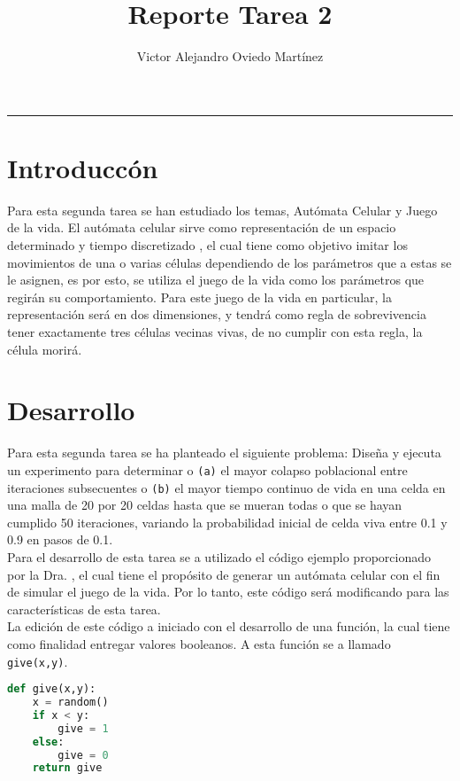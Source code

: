 \documentclass{article}
\title{Reporte Tarea 2}
\author{Victor Alejandro Oviedo Martínez}
\begin{document}
\maketitle
\hrule

\section{Introduccón}\label{intro}
Para esta segunda tarea\citep{DRA.P2} se han estudiado los temas, Autómata Celular\citep{AutoCelular} y Juego de la vida\citep{JVida}. El autómata celular sirve como representación de un espacio determinado y tiempo discretizado , el cual tiene como objetivo imitar los movimientos de una o varias células dependiendo de los parámetros que a estas se le asignen, es por esto, se utiliza el juego de la vida como los parámetros que regirán su comportamiento. Para este juego de la vida en particular, la representación será en dos dimensiones, y tendrá como regla de sobrevivencia  tener exactamente tres células vecinas vivas, de no cumplir con esta regla, la célula morirá. 

\section{Desarrollo}


Para esta segunda tarea se ha planteado el siguiente problema: Diseña y ejecuta un experimento para determinar o \texttt{(a)} el mayor colapso poblacional entre iteraciones subsecuentes o \texttt{(b)} el mayor tiempo continuo de vida en una celda en una malla de 20 por 20 celdas hasta que se mueran todas o que se hayan cumplido 50 iteraciones, variando la probabilidad inicial de celda viva entre 0.1 y 0.9 en pasos de 0.1.\\

Para el desarrollo de esta tarea se a utilizado el código ejemplo proporcionado por la Dra. \citet{Ejem}, el cual tiene el propósito de generar un autómata celular con el fin de simular el juego de la vida. Por lo tanto, este código será modificando para las características de esta tarea.\\

La edición de este código a iniciado con el desarrollo de una función, la cual tiene como finalidad entregar valores booleanos. A esta función se a llamado \texttt{give(x,y)}.\\

\begin{lstlisting}[language=Python]
def give(x,y):
    x = random()
    if x < y:
        give = 1
    else:
        give = 0
    return give
\end{lstlisting}
\end{document}

